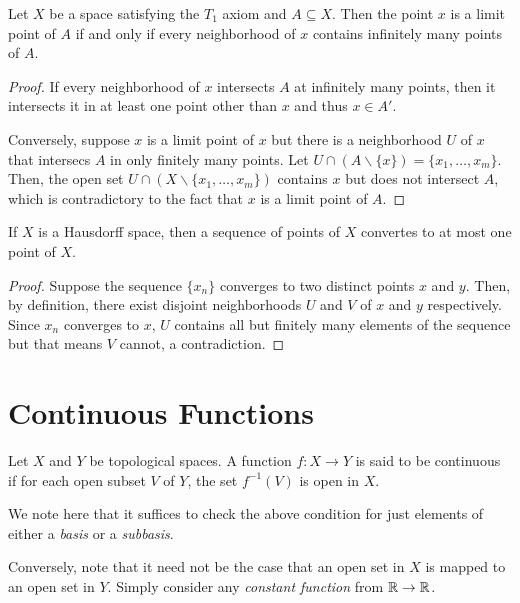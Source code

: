 \begin{theorem}
    Let $X$ be a space satisfying the $T_1$ axiom and $A\subseteq X$. Then the point $x$ is a limit point of $A$ if and only if every neighborhood of $x$ contains infinitely many points of $A$.
\end{theorem}
\begin{proof}
    If every neighborhood of $x$ intersects $A$ at infinitely many points, then it intersects it in at least one point other than $x$ and thus $x\in A'$.
    
    Conversely, suppose $x$ is a limit point of $x$ but there is a neighborhood $U$ of $x$ that intersecs $A$ in only finitely many points. Let $U\cap(A\backslash\{x\}) = \{x_1,\ldots,x_m\}$. Then, the open set $U\cap(X\backslash\{x_1,\ldots,x_m\})$ contains $x$ but does not intersect $A$, which is contradictory to the fact that $x$ is a limit point of $A$.
\end{proof}

\begin{theorem}
    If $X$ is a Hausdorff space, then a sequence of points of $X$ convertes to at most one point of $X$.
\end{theorem}
\begin{proof}
    Suppose the sequence $\{x_n\}$ converges to two distinct points $x$ and $y$. Then, by definition, there exist disjoint neighborhoods $U$ and $V$ of $x$ and $y$ respectively. Since $x_n$ converges to $x$, $U$ contains all but finitely many elements of the sequence but that means $V$ cannot, a contradiction.
\end{proof}


\section{Continuous Functions}
\begin{definition}[Continuity]
    Let $X$ and $Y$ be topological spaces. A function $f:X\to Y$ is said to be continuous if for each open subset $V$ of $Y$, the set $f^{-1}(V)$ is open in $X$.
\end{definition}

We note here that it suffices to check the above condition for just elements of either a \textit{basis} or a \textit{subbasis}.

\begin{mdframed}
    Conversely, note that it need not be the case that an open set in $X$ is mapped to an open set in $Y$. Simply consider any \textit{constant function} from $\mathbb{R}\to\mathbb{R}$.
\end{mdframed}


